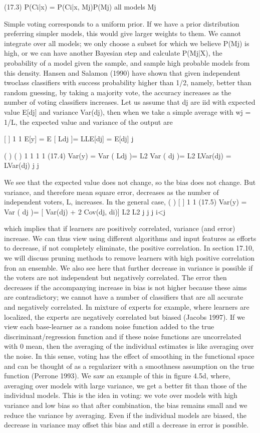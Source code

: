 (17.3) P(Ci|x) = P(Ci|x, Mj)P(Mj) all models Mj

Simple voting corresponds to a uniform prior. If we have a prior distribution preferring simpler models, this would give larger weights to them. We cannot integrate over all models; we only choose a subset for which we believe P(Mj) is high, or we can have another Bayesian step and calculate P(Mj|X), the probability of a model given the sample, and sample high probable models from this density. Hansen and Salamon (1990) have shown that given independent twoclass classifiers with success probability higher than 1/2, namely, better than random guessing, by taking a majority vote, the accuracy increases as the number of voting classifiers increases. Let us assume that dj are iid with expected value E[dj] and variance Var(dj), then when we take a simple average with wj = 1/L, the expected value and variance of the output are

[ ] 1 1 E[y] = E [ Ldj ]= LLE[dj] = E[dj] j

( ) ( ) 1 1 1 1 (17.4) Var(y) = Var ( Ldj )= L2 Var ( dj )= L2 LVar(dj) = LVar(dj) j j

We see that the expected value does not change, so the bias does not change. But variance, and therefore mean square error, decreases as the number of independent voters, L, increases. In the general case, ( ) [ ] 1 1 (17.5) Var(y) = Var ( dj )= [ Var(dj) + 2 Cov(dj, di)] L2 L2 j j j i<j

which implies that if learners are positively correlated, variance (and error) increase. We can thus view using different algorithms and input features as efforts to decrease, if not completely eliminate, the positive correlation. In section 17.10, we will discuss pruning methods to remove learners with high positive correlation fron an ensemble. We also see here that further decrease in variance is possible if the voters are not independent but negatively correlated. The error then decreases if the accompanying increase in bias is not higher because these aims are contradictory; we cannot have a number of classifiers that are all accurate and negatively correlated. In mixture of experts for example, where learners are localized, the experts are negatively correlated but biased (Jacobs 1997). If we view each base-learner as a random noise function added to the true discriminant/regression function and if these noise functions are uncorrelated with 0 mean, then the averaging of the individual estimates is like averaging over the noise. In this sense, voting has the effect of smoothing in the functional space and can be thought of as a regularizer with a smoothness assumption on the true function (Perrone 1993). We saw an example of this in figure 4.5d, where, averaging over models with large variance, we get a better fit than those of the individual models. This is the idea in voting: we vote over models with high variance and low bias so that after combination, the bias remains small and we reduce the variance by averaging. Even if the individual models are biased, the decrease in variance may offset this bias and still a decrease in error is possible.

